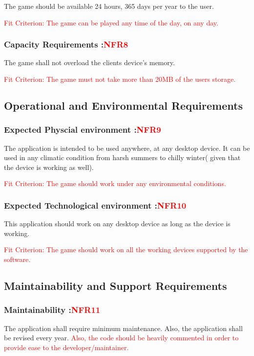 \documentclass[12pt, titlepage]{article}
\begin{document}
The game should be available 24 hours, 365 days per year to the user.

\textcolor{red}{Fit Criterion: The game can be played any time of the day, on any day.}
\subsubsection{Capacity Requirements :\textcolor{red}{NFR8}}

The game shall not overload the clients device's memory. 

\textcolor{red}{Fit Criterion: The game must not take more than 20MB of the users storage.}
\subsection{Operational and Environmental Requirements}

\subsubsection{Expected Physcial environment :\textcolor{red}{NFR9}}

The application is intended to be used anywhere, at any desktop device. It can be used in any climatic condition from harsh summers to chilly winter( given that the device is working as well).

\textcolor{red}{Fit Criterion: The game should work under any environmental conditions.}
\subsubsection{Expected Technological environment :\textcolor{red}{NFR10}}

This application should work on any desktop device as long as the device is working.

\textcolor{red}{Fit Criterion: The game should work on all the working devices supported by the software.}
\subsection{Maintainability and Support Requirements}

\subsubsection{Maintainability :\textcolor{red}{NFR11}}

The application shall require minimum maintenance. Also, the application shall be revised every year. \textcolor{red}{Also, the code should be heavily commented in order to provide ease to the developer/maintainer.}
\end{document}
